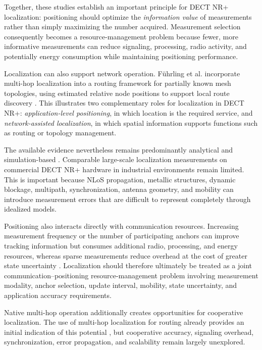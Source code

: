 Together, these studies establish an important principle for DECT NR+
localization: positioning should optimize the \emph{information value} of
measurements rather than simply maximizing the number acquired. Measurement
selection consequently becomes a resource-management problem because fewer,
more informative measurements can reduce signaling, processing, radio
activity, and potentially energy consumption while maintaining positioning
performance.

Localization can also support network operation. F{\"u}hrling et al.
incorporate multi-hop localization into a routing framework for partially
known mesh topologies, using estimated relative node positions to support
local route discovery
\cite{fuhrlingRobustRoutingProtocol2025b}. This illustrates two complementary
roles for localization in DECT NR+: \emph{application-level positioning}, in
which location is the required service, and \emph{network-assisted
localization}, in which spatial information supports functions such as routing
or topology management.

The available evidence nevertheless remains predominantly analytical and
simulation-based
\cite{saikkoPositioningDECT2020NR2024,
saikkoPositioningTrackingDECT20202025}. Comparable large-scale localization
measurements on commercial DECT NR+ hardware in industrial environments remain
limited. This is important because NLoS propagation, metallic structures,
dynamic blockage, multipath, synchronization, antenna geometry, and mobility
can introduce measurement errors that are difficult to represent completely
through idealized models.

Positioning also interacts directly with communication resources. Increasing
measurement frequency or the number of participating anchors can improve
tracking information but consumes additional radio, processing, and energy
resources, whereas sparse measurements reduce overhead at the cost of greater
state uncertainty
\cite{saikkoPositioningDECT2020NR2024,
saikkoPositioningTrackingDECT20202025}. Localization should therefore
ultimately be treated as a joint communication--positioning resource-management
problem involving measurement modality, anchor selection, update interval,
mobility, state uncertainty, and application accuracy requirements.

Native multi-hop operation additionally creates opportunities for cooperative
localization. The use of multi-hop localization for routing already provides
an initial indication of this potential
\cite{fuhrlingRobustRoutingProtocol2025b}, but cooperative accuracy,
signaling overhead, synchronization, error propagation, and scalability remain
largely unexplored.

